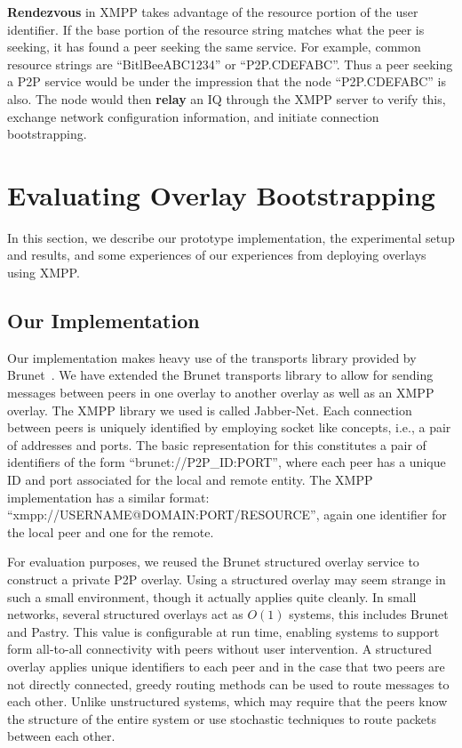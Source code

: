 \documentclass[conference]{IEEEtran}
\begin{document}
\textbf{Rendezvous} in XMPP takes advantage of the resource portion of the user
identifier.  If the base portion of the resource string matches what the peer
is seeking, it has found a peer seeking the same service.  For example, common
resource strings are ``BitlBeeABC1234'' or ``P2P.CDEFABC''.  Thus a peer
seeking a P2P service would be under the impression that the node
``P2P.CDEFABC'' is also.  The node would then \textbf{relay} an IQ through the
XMPP server to verify this, exchange network configuration information, and
initiate connection bootstrapping.

\section{Evaluating Overlay Bootstrapping}
\label{evaluations}
In this section, we describe our prototype implementation, the experimental
setup and results, and some experiences of our experiences from deploying
overlays using XMPP.

\subsection{Our Implementation}

Our implementation makes heavy use of the transports library provided by
Brunet~\cite{brunet}.  We have extended the Brunet transports library to allow
for sending messages between peers in one overlay to another overlay as well as
an XMPP overlay.  The XMPP library we used is called Jabber-Net.  Each
connection between peers is uniquely identified by employing socket like
concepts, i.e., a pair of addresses and ports.  The basic representation for
this constitutes a pair of identifiers of the form ``brunet://P2P\_ID:PORT'',
where each peer has a unique ID and port associated for the local and remote
entity.  The XMPP implementation has a similar format:
``xmpp://USERNAME@DOMAIN:PORT/RESOURCE'', again one identifier for the local
peer and one for the remote.

For evaluation purposes, we reused the Brunet structured overlay service to
construct a private P2P overlay.  Using a structured overlay may seem strange
in such a small environment, though it actually applies quite cleanly.  In
small networks, several structured overlays act as $O(1)$ systems, this
includes Brunet and Pastry.  This value is configurable at run time, enabling
systems to support form all-to-all connectivity with peers without user
intervention.  A structured overlay applies unique identifiers to each peer and
in the case that two peers are not directly connected, greedy routing methods
can be used to route messages to each other.  Unlike unstructured systems,
which may require that the peers know the structure of the entire system or use
stochastic techniques to route packets between each other.
\end{document}
